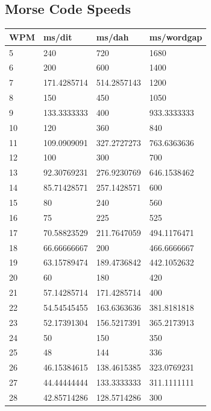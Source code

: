 \documentclass[a4paper]{tufte-handout}
\begin{document}
\subsection{Morse Code Speeds}

    \begin{table}[!h]
        \footnotesize
        \centering
        \selectfont
        \begin{tabular}{llll}
            \toprule
            WPM & ms/dit & ms/dah & ms/wordgap \\
            \midrule
            5 & 240 & 720 & 1680 \\
            6 & 200 & 600 & 1400 \\
            7 & 171.4285714 & 514.2857143 & 1200 \\
            8 & 150 & 450 & 1050 \\
            9 & 133.3333333 & 400 & 933.3333333 \\
            10 & 120 & 360 & 840 \\
            11 & 109.0909091 & 327.2727273 & 763.6363636 \\
            12 & 100 & 300 & 700 \\
            13 & 92.30769231 & 276.9230769 & 646.1538462 \\
            14 & 85.71428571 & 257.1428571 & 600 \\
            15 & 80 & 240 & 560 \\
            16 & 75 & 225 & 525 \\
            17 & 70.58823529 & 211.7647059 & 494.1176471 \\
            18 & 66.66666667 & 200 & 466.6666667 \\
            19 & 63.15789474 & 189.4736842 & 442.1052632 \\
            20 & 60 & 180 & 420 \\
            21 & 57.14285714 & 171.4285714 & 400 \\
            22 & 54.54545455 & 163.6363636 & 381.8181818 \\
            23 & 52.17391304 & 156.5217391 & 365.2173913 \\
            24 & 50 & 150 & 350 \\
            25 & 48 & 144 & 336 \\
            26 & 46.15384615 & 138.4615385 & 323.0769231 \\
            27 & 44.44444444 & 133.3333333 & 311.1111111 \\
            28 & 42.85714286 & 128.5714286 & 300 \\

\end{tabular}
\end{table}
\end{document}
